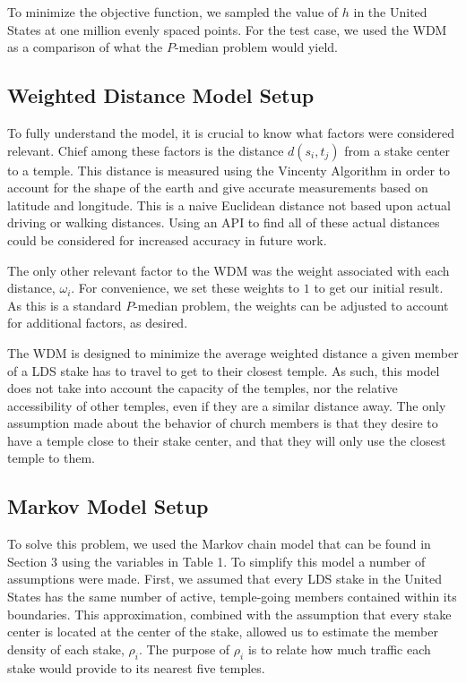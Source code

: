 \documentclass[twoside,twocolumn]{article}
\begin{document}
To minimize the objective function, we sampled the value of $h$ in the United States at one million evenly spaced points.
For the test case, we used the WDM as a comparison of what the $P$-median problem would yield.
\subsection{Weighted Distance Model Setup}

To fully understand the model, it is crucial to know what factors were considered relevant.
Chief among these factors is the distance $d(s_i,t_j)$ from a stake center to a temple. %
This distance is measured using the Vincenty Algorithm in order to account for the shape of the earth and give accurate measurements based on latitude and longitude. %
This is a naive Euclidean distance not based upon actual driving or walking distances.
Using an API to find all of these actual distances could be considered for increased accuracy in future work.

The only other relevant factor to the WDM was the weight associated with each distance, $\omega_i$. %
For convenience, we set these weights to $1$ to get our initial result.
As this is a standard $P$-median problem, the weights can be adjusted to account for additional factors, as desired.

The WDM is designed to minimize the average weighted distance a given member of a LDS stake has to travel to get to their closest temple.
As such, this model does not take into account the capacity of the temples, nor the relative accessibility of other temples, even if they are a similar distance away.
The only assumption made about the behavior of church members is that they desire to have a temple close to their stake center, and that they will only use the closest temple to them. %

\subsection{Markov Model Setup}

To solve this problem, we used the Markov chain model that can be found in Section 3 using the variables in Table 1.
To simplify this model a number of assumptions were made.
First, we assumed that every LDS stake in the United States has the same number of active, temple-going members contained within its boundaries.
This approximation, combined with the assumption that every stake center is located at the center of the stake, allowed us to estimate the member density of each stake, $\rho_i$.
The purpose of $\rho_{i}$ is to relate how much traffic each stake would provide to its nearest five temples. %
\end{document}

